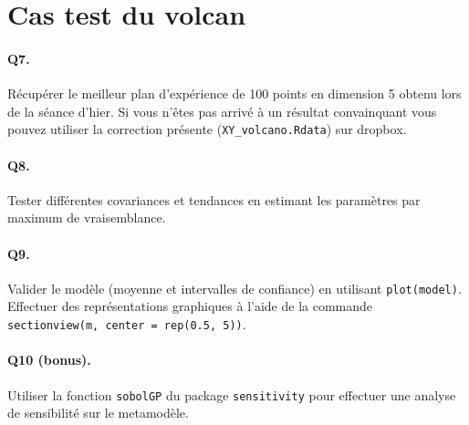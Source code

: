 \documentclass[12pt]{scrartcl}
\begin{document}
\section{Cas test du volcan}

\paragraph{Q7.} Récupérer le meilleur plan d'expérience de 100 points en dimension 5 obtenu lors de la séance d'hier. 
Si vous n'êtes pas arrivé à un résultat convainquant vous pouvez utiliser la correction présente (\texttt{XY\_volcano.Rdata}) sur dropbox.

\paragraph{Q8.} Tester différentes covariances et tendances en estimant les paramètres par maximum de vraisemblance.

\paragraph{Q9. } Valider le modèle (moyenne et intervalles de confiance) en utilisant \texttt{plot(model)}. Effectuer des représentations graphiques à l'aide de la commande \texttt{sectionview(m, center = rep(0.5, 5))}. 

\paragraph{Q10 (bonus).} Utiliser la fonction \texttt{sobolGP} du package \texttt{sensitivity} pour effectuer une analyse de sensibilité sur le metamodèle.
\end{document}
